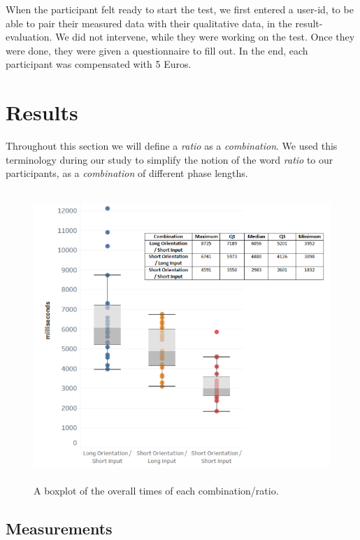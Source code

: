 When the participant felt ready to start the test, we first entered a user-id, to be able to pair their measured data with their qualitative data, in the result-evaluation. We did not intervene, while they were working on the test. Once they were done, they were given a questionnaire to fill out. In the end, each participant was compensated with 5 Euros.



\section{Results} \label{5.4}

Throughout this section we will define a \textit{ratio} as a \textit{combination}. We used this terminology during our study to simplify the notion of the word \textit{ratio} to our participants, as a \textit{combination} of different phase lengths.

\begin{figure}[t!]
\centering
\includegraphics[width=13cm, height=11cm]{Chapters/graphics/Combinations.png}
\caption{A boxplot of the overall times of each combination/ratio.}
\label{fig:combination}
\end{figure}

\subsection{Measurements}

